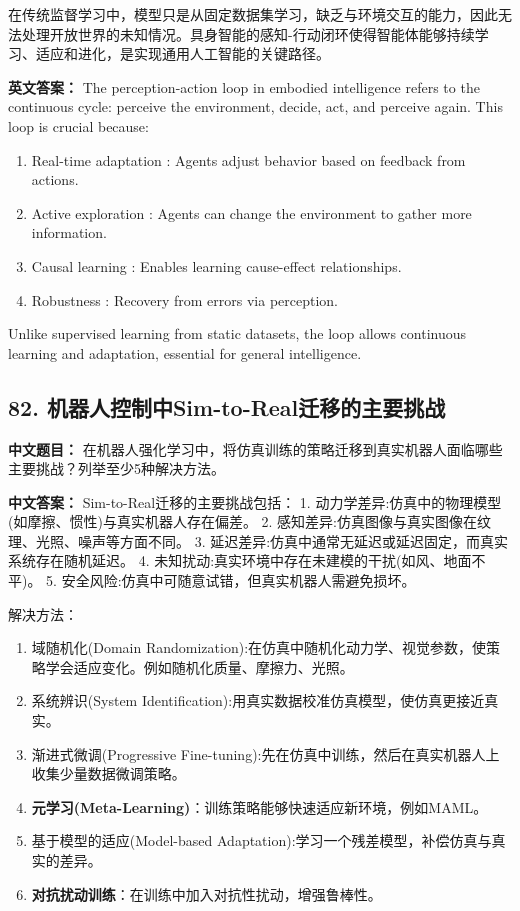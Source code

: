 \documentclass[10pt,a4paper]{ctexart}
\begin{document}
在传统监督学习中，模型只是从固定数据集学习，缺乏与环境交互的能力，因此无法处理开放世界的未知情况。具身智能的感知-行动闭环使得智能体能够持续学习、适应和进化，是实现通用人工智能的关键路径。

\textbf{英文答案：}  
The perception-action loop in embodied intelligence refers to the continuous cycle: perceive the environment, decide, act, and perceive again. This loop is crucial because:
\begin{enumerate}
    \item Real-time adaptation : Agents adjust behavior based on feedback from actions.
    \item Active exploration : Agents can change the environment to gather more information.
    \item Causal learning : Enables learning cause-effect relationships.
    \item Robustness : Recovery from errors via perception.
\end{enumerate}

Unlike supervised learning from static datasets, the loop allows continuous learning and adaptation, essential for general intelligence.

\subsection*{82. 机器人控制中Sim-to-Real迁移的主要挑战}
\textbf{中文题目：} 在机器人强化学习中，将仿真训练的策略迁移到真实机器人面临哪些主要挑战？列举至少5种解决方法。

\textbf{中文答案：}  
Sim-to-Real迁移的主要挑战包括：
1.  动力学差异:仿真中的物理模型(如摩擦、惯性)与真实机器人存在偏差。
2.  感知差异:仿真图像与真实图像在纹理、光照、噪声等方面不同。
3.  延迟差异:仿真中通常无延迟或延迟固定，而真实系统存在随机延迟。
4.  未知扰动:真实环境中存在未建模的干扰(如风、地面不平)。
5.  安全风险:仿真中可随意试错，但真实机器人需避免损坏。

解决方法：
\begin{enumerate}
    \item 域随机化(Domain Randomization):在仿真中随机化动力学、视觉参数，使策略学会适应变化。例如随机化质量、摩擦力、光照。
    \item 系统辨识(System Identification):用真实数据校准仿真模型，使仿真更接近真实。
    \item 渐进式微调(Progressive Fine-tuning):先在仿真中训练，然后在真实机器人上收集少量数据微调策略。
    \item \textbf{元学习(Meta-Learning)}：训练策略能够快速适应新环境，例如MAML。
    \item 基于模型的适应(Model-based Adaptation):学习一个残差模型，补偿仿真与真实的差异。
    \item \textbf{对抗扰动训练}：在训练中加入对抗性扰动，增强鲁棒性。
\end{enumerate}
\end{document}
